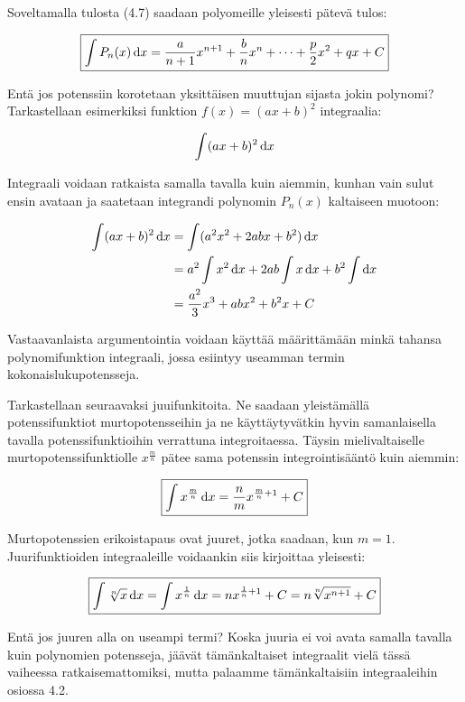 \documentclass[../integrointiopas.tex]{subfiles}
\begin{document}
	Soveltamalla tulosta (4.7) saadaan polyomeille yleisesti pätevä tulos:
	
	\begin{equation}
		\boxed{\int P_n(x)\odif{x} = \frac{a}{n + 1}x^{n + 1} + \frac{b}{n}x^n + \dots + \frac{p}{2}x^2 + qx + C}
	\end{equation}
	
	Entä jos potenssiin korotetaan yksittäisen muuttujan sijasta jokin polynomi? Tarkastellaan esimerkiksi funktion $f(x) = (ax + b)^2$ integraalia:
	
	\begin{equation}
		\int(ax + b)^2\odif{x}
	\end{equation}
	
	Integraali voidaan ratkaista samalla tavalla kuin aiemmin, kunhan vain sulut ensin avataan ja saatetaan integrandi polynomin $P_n(x)$ kaltaiseen muotoon:
	
	\begin{align}
		\int(ax + b)^2\odif{x} &= \int(a^2x^2 + 2abx + b^2)\odif{x} \\
		&= a^2\int x^2\odif{x} + 2ab\int x\odif{x} + b^2\int\odif{x} \\
		&= \frac{a^2}{3}x^3 + abx^2 + b^2x + C
	\end{align}
	
	Vastaavanlaista argumentointia voidaan käyttää määrittämään minkä tahansa polynomifunktion integraali, jossa esiintyy useamman termin kokonaislukupotensseja.
	
	Tarkastellaan seuraavaksi juuifunkitoita. Ne saadaan yleistämällä potenssifunktiot murtopotensseihin ja ne käyttäytyvätkin hyvin samanlaisella tavalla potenssifunktioihin verrattuna integroitaessa. Täysin mielivaltaiselle murtopotenssifunktiolle $x^{\frac{m}{n}}$ pätee sama potenssin integrointisääntö kuin aiemmin:
	
	\begin{equation}
		\boxed{\int x^{\frac{m}{n}}\odif{x} = \frac{n}{m}x^{\frac{m}{n} + 1} + C}
	\end{equation}
	
	Murtopotenssien erikoistapaus ovat juuret, jotka saadaan, kun $m = 1$. Juurifunktioiden integraaleille voidaankin siis kirjoittaa yleisesti:
	
	\begin{equation}
		\boxed{\int \sqrt[n]{x}\odif{x} = \int x^{\frac{1}{n}}\odif{x} = nx^{\frac{1}{n} + 1} + C = n\sqrt[n]{x^{n+1}} + C}
	\end{equation}
	
	Entä jos juuren alla on useampi termi? Koska juuria ei voi avata samalla tavalla kuin polynomien potensseja, jäävät tämänkaltaiset integraalit vielä tässä vaiheessa ratkaisemattomiksi, mutta palaamme tämänkaltaisiin integraaleihin osiossa 4.2.
	
\end{document}

